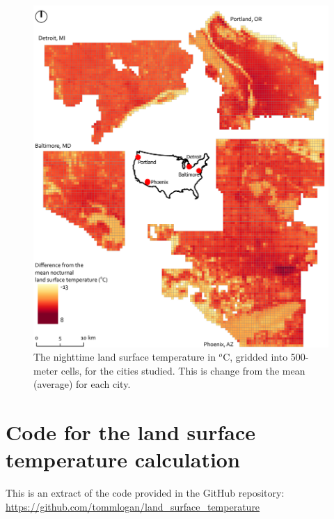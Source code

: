 \documentclass[final,3p,times,onecolumn,sort&compress]{elsarticle}
\begin{document}
\begin{figure}
    \centering
    \includegraphics[width=\textwidth]{fig/report/map_nocturnal_lst.pdf}
    \caption[The nighttime land surface temperature in $^o$C, gridded into 500-meter cells]{The nighttime land surface temperature in $^o$C, gridded into 500-meter cells, for the cities studied. This is change from the mean (average) for each city.}
    \label{fig:map}
\end{figure}


\newpage
\section{Code for the land surface temperature calculation}
\label{appendix:code}

This is an extract of the code provided in the GitHub repository: \url{https://github.com/tommlogan/land_surface_temperature}
\end{document}
